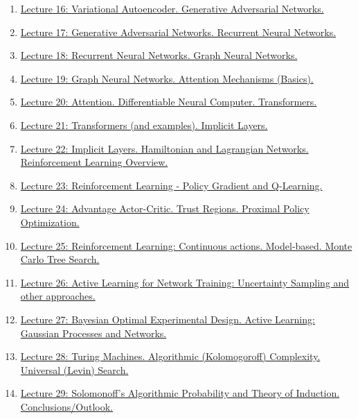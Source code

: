\documentclass[11pt]{article}
\begin{document}
\begin{enumerate}
	\item \href{https://mp.weixin.qq.com/s/i_QjCpibflejgeUql1qojQ}{Lecture 16: Variational Autoencoder. Generative Adversarial Networks.}%
	\item \href{https://mp.weixin.qq.com/s/RbPXU8Es-ipy9bOt1zeKcA}{Lecture 17: Generative Adversarial Networks. Recurrent Neural Networks.}%
	\item \href{https://mp.weixin.qq.com/s/4VGsSCHsf2Jsp6WmaRivAw}{Lecture 18: Recurrent Neural Networks. Graph Neural Networks.}%
	\item \href{https://mp.weixin.qq.com/s/8kGlkNaP9rnTIcBE6d46aA}{Lecture 19: Graph Neural Networks. Attention Mechanisms (Basics).}%
	\item \href{https://mp.weixin.qq.com/s/GvGFZBGskYBRd89KH1MvCg}{Lecture 20: Attention. Differentiable Neural Computer. Transformers.}%
	\item \href{https://mp.weixin.qq.com/s/jI3TAmtOXYaqy3U2nRN-gg}{Lecture 21: Transformers (and examples). Implicit Layers.}%
	\item \href{https://mp.weixin.qq.com/s/t0yu1kgJZplIHeoe_gzmeA}{Lecture 22: Implicit Layers. Hamiltonian and Lagrangian Networks. Reinforcement Learning Overview.}%
	\item \href{https://mp.weixin.qq.com/s/nnghVZXxebGAPPRU61wEXw}{Lecture 23: Reinforcement Learning - Policy Gradient and Q-Learning.}%
	\item \href{https://mp.weixin.qq.com/s/SK0vRxXBOLFTYe-75DL35g}{Lecture 24: Advantage Actor-Critic. Trust Regions. Proximal Policy Optimization.}%
	\item \href{https://mp.weixin.qq.com/s/XejVx34Xeu9MTbIENMuJJw}{Lecture 25: Reinforcement Learning: Continuous actions. Model-based. Monte Carlo Tree Search.}%
	\item \href{https://mp.weixin.qq.com/s/nG5CdFTxCK48HwxPLAKlUA}{Lecture 26: Active Learning for Network Training: Uncertainty Sampling and other approaches.}%
	\item \href{https://mp.weixin.qq.com/s/jjAWohCS942dOftl4-RO5A}{ Lecture 27: Bayesian Optimal Experimental Design. Active Learning: Gaussian Processes and Networks.}%
	\item \href{https://mp.weixin.qq.com/s/lBQL5RmAbNq2QuiHWl4YPA}{Lecture 28: Turing Machines. Algorithmic (Kolomogoroff) Complexity. Universal (Levin) Search.}%
	\item \href{https://mp.weixin.qq.com/s/aWXLGFTHQqYc0wGxARo2kA}{Lecture 29: Solomonoff's Algorithmic Probability and Theory of Induction. Conclusions/Outlook.}%

\end{enumerate}
\end{document}
